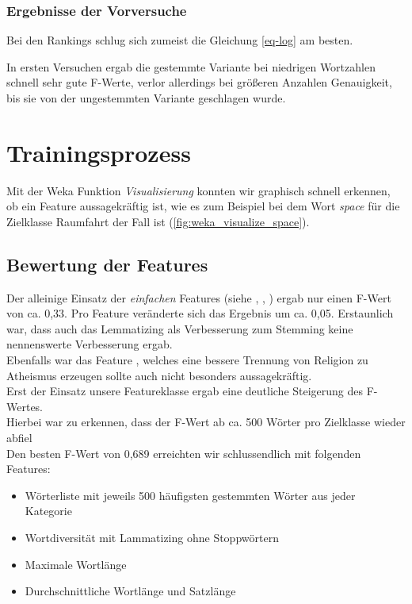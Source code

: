 \documentclass[
	11pt,
	a4paper
]{scrartcl}
\begin{document}
\subsubsection{Ergebnisse der Vorversuche}

Bei den Rankings schlug sich zumeist die Gleichung \ref{eq-log} am besten.

In ersten Versuchen ergab die gestemmte Variante bei niedrigen Wortzahlen schnell sehr gute F-Werte, verlor allerdings bei größeren Anzahlen Genauigkeit, bis sie von der ungestemmten Variante geschlagen wurde.

\section{Trainingsprozess}\label{trainingsprozess}
Mit der Weka Funktion \emph{Visualisierung} konnten wir graphisch schnell erkennen, ob ein Feature aussagekräftig ist, wie es zum
Beispiel bei dem Wort \emph{space} für die Zielklasse Raumfahrt der Fall ist (\autoref{fig:weka_visualize_space}).

\subsection{Bewertung der Features}
Der alleinige Einsatz der \emph{einfachen} Features (siehe \emph{}, \emph{},
\emph{}) ergab nur einen F-Wert von ca. 0,33. Pro Feature veränderte sich das Ergebnis um ca. 0,05. Erstaunlich
war, dass auch das Lemmatizing als Verbesserung zum Stemming keine nennenswerte Verbesserung ergab.\\
Ebenfalls war das Feature \emph{}, welches eine bessere Trennung von Religion zu Atheismus erzeugen sollte auch nicht
besonders aussagekräftig.\\
Erst der Einsatz unsere Featureklasse \emph{} ergab eine deutliche Steigerung des F-Wertes.\\
Hierbei war zu erkennen, dass der F-Wert ab ca. 500 Wörter pro Zielklasse wieder abfiel\\
Den besten F-Wert von 0,689 erreichten wir schlussendlich mit folgenden Features:
\begin{itemize}[itemsep=0pt,parsep=0pt, topsep=0pt]
	\item Wörterliste mit jeweils 500 häufigsten gestemmten Wörter aus jeder Kategorie
	\item Wortdiversität mit Lammatizing ohne Stoppwörtern
	\item Maximale Wortlänge
	\item Durchschnittliche Wortlänge und Satzlänge
\end{itemize}
\end{document}
